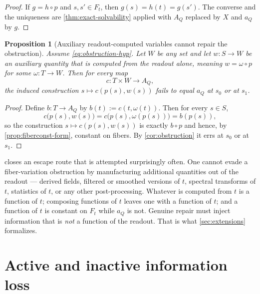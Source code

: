 \documentclass[11pt,reqno]{amsart}
\theoremstyle{plain}
\newtheorem{proposition}[theorem]{Proposition}
\theoremstyle{definition}
\newcommand{\Src}{S}
\newcommand{\Rdt}{T}
\begin{document}
\begin{proof}
If $g=h\circ p$ and $s,s'\in F_t$, then $g(s)=h(t)=g(s')$. The converse and the uniqueness are
\cref{thm:exact-solvability} applied with $A_Q$ replaced by $X$ and $a_Q$ by $g$.
\end{proof}

\begin{proposition}[Auxiliary readout-computed variables cannot repair the
obstruction]\label{prop:auxiliary-useless}
Assume \eqref{eq:obstruction-hyp}. Let $W$ be any set and let $w\colon\Src\to W$ be an auxiliary
quantity that is \emph{computed from the readout alone}, meaning $w=\omega\circ p$ for some
$\omega\colon\Rdt\to W$. Then for every map
\begin{equation*}
c\colon\Rdt\times W\longrightarrow A_Q,
\end{equation*}
the induced construction $s\mapsto c(p(s),w(s))$ fails to equal $a_Q$ at $s_0$ or at $s_1$.
\end{proposition}

\begin{proof}
Define $b\colon\Rdt\to A_Q$ by $b(t):=c(t,\omega(t))$. Then for every $s\in\Src$,
\begin{equation*}
c\bigl(p(s),w(s)\bigr)=c\bigl(p(s),\omega(p(s))\bigr)=b(p(s)),
\end{equation*}
so the construction $s\mapsto c(p(s),w(s))$ is exactly $b\circ p$ and hence, by
\cref{prop:fiberconst-form}, constant on fibers. By \cref{cor:obstruction} it errs at $s_0$ or at
$s_1$.
\end{proof}

 closes an escape route that is attempted surprisingly often. One
cannot evade a fiber-variation obstruction by manufacturing additional quantities out of the
readout --- derived fields, filtered or smoothed versions of $t$, spectral transforms of $t$,
statistics of $t$, or any other post-processing. Whatever is computed from $t$ is a function of
$t$; composing functions of $t$ leaves one with a function of $t$; and a function of $t$ is
constant on $F_t$ while $a_Q$ is not. Genuine repair must inject information that is
\emph{not} a function of the readout. That is what \cref{sec:extensions} formalizes.

\section{Active and inactive information loss}\label{sec:active}
\end{document}
